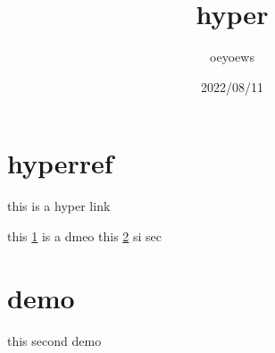 \documentclass[UTF8]{article}
\title{hyper}
\author{oeyoews}
\date{2022/08/11}
\begin{document}
\maketitle

\section{hyperref}%
\label{sec:hyperref}
this is a hyper link

this \ref{sec:hyperref} is a dmeo
this \ref{sec:demo} si sec

\newpage

\section{demo}%
\label{sec:demo}

this second \pageref{sec:hyperref} demo
\end{document}
